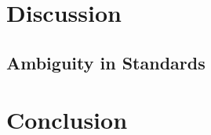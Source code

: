 \documentclass{mcurcsm}
\begin{document}
\section{Discussion}

\subsection{Ambiguity in Standards}


\section{Conclusion}

%
%

%
\end{document}
